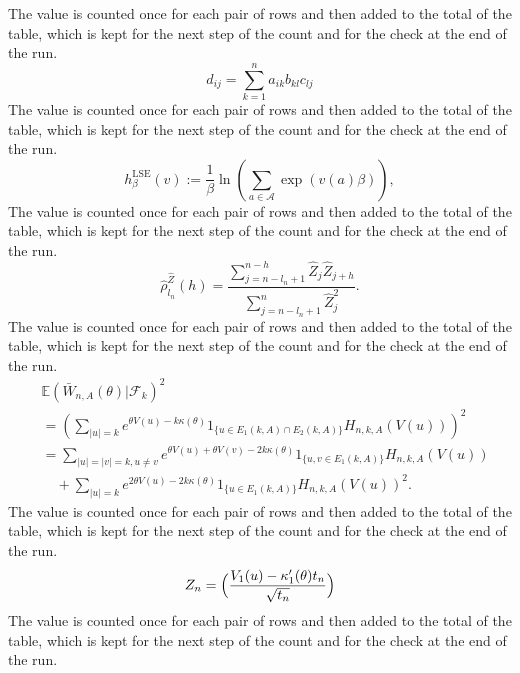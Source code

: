 \documentclass[11pt]{article}
\newcommand{\filler}{The value is counted once for each pair of rows and then added to the
total of the table, which is kept for the next step of the count and for the check at the end
of the run. }
\begin{document}
\filler
\[ d_{ij} = \sum_{k=1}^{n} a_{ik} b_{kl} c_{lj} \]
\filler
\begin{equation}
h_{\beta}^{\mathrm{LSE}}(v) := \frac{1}{\beta} \ln \left( \sum_{a \in \mathcal{A}} \exp(v(a) \beta) \right) ,
\end{equation}
\filler
\[ \hat{\rho}_{l_n}^{\hat{Z}}(h) = \frac{\sum_{j=n-l_n+1}^{n-h} \hat{Z}_j \hat{Z}_{j+h}}{\sum_{j=n-l_n+1}^{n} \hat{Z}_j^2} . \]
\filler
\begin{align*}
& \mathbb{E}( \bar{W}_{n,A}(\theta) | \mathcal{F}_k )^2 \\
&= \left( \sum_{|u|=k} e^{\theta V(u) - k \kappa(\theta)} 1_{\{u \in E_1(k,A) \cap E_2(k,A)\}} H_{n,k,A}(V(u)) \right)^2 \\
&= \sum_{|u|=|v|=k, u \neq v} e^{\theta V(u) + \theta V(v) - 2k \kappa(\theta)} 1_{\{u,v \in E_1(k,A)\}} H_{n,k,A}(V(u)) \\
& \quad + \sum_{|u|=k} e^{2 \theta V(u) - 2k \kappa(\theta)} 1_{\{u \in E_1(k,A)\}} H_{n,k,A}(V(u))^2 .
\end{align*}
\filler
\[ Z_n = \Bigl( \frac{V_1(u) - \kappa'_1(\theta) t_n}{\sqrt{t_n}} \Bigr) \]
\filler
\end{document}
